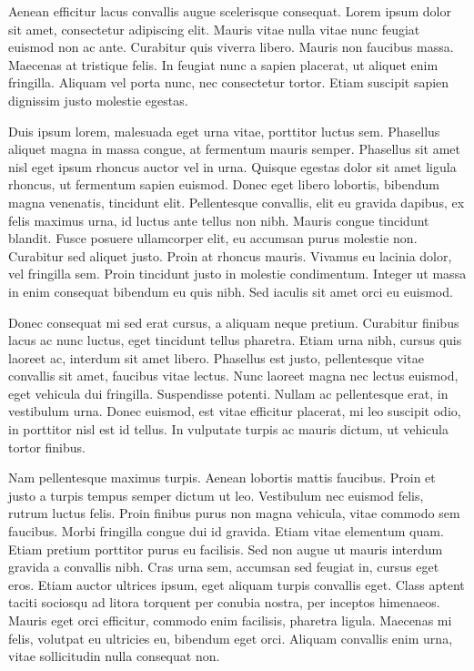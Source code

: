 \documentclass{icorsdssv2024}
\begin{document}
Aenean efficitur lacus convallis augue scelerisque consequat. Lorem ipsum dolor sit amet, consectetur adipiscing elit. Mauris vitae nulla vitae nunc feugiat euismod non ac ante. Curabitur quis viverra libero. Mauris non faucibus massa. Maecenas at tristique felis. In feugiat nunc a sapien placerat, ut aliquet enim fringilla. Aliquam vel porta nunc, nec consectetur tortor. Etiam suscipit sapien dignissim justo molestie egestas.

Duis ipsum lorem, malesuada eget urna vitae, porttitor luctus sem. Phasellus aliquet magna in massa congue, at fermentum mauris semper. Phasellus sit amet nisl eget ipsum rhoncus auctor vel in urna. Quisque egestas dolor sit amet ligula rhoncus, ut fermentum sapien euismod. Donec eget libero lobortis, bibendum magna venenatis, tincidunt elit. Pellentesque convallis, elit eu gravida dapibus, ex felis maximus urna, id luctus ante tellus non nibh. Mauris congue tincidunt blandit. Fusce posuere ullamcorper elit, eu accumsan purus molestie non. Curabitur sed aliquet justo. Proin at rhoncus mauris. Vivamus eu lacinia dolor, vel fringilla sem. Proin tincidunt justo in molestie condimentum. Integer ut massa in enim consequat bibendum eu quis nibh. Sed iaculis sit amet orci eu euismod.

Donec consequat mi sed erat cursus, a aliquam neque pretium. Curabitur finibus lacus ac nunc luctus, eget tincidunt tellus pharetra. Etiam urna nibh, cursus quis laoreet ac, interdum sit amet libero. Phasellus est justo, pellentesque vitae convallis sit amet, faucibus vitae lectus. Nunc laoreet magna nec lectus euismod, eget vehicula dui fringilla. Suspendisse potenti. Nullam ac pellentesque erat, in vestibulum urna. Donec euismod, est vitae efficitur placerat, mi leo suscipit odio, in porttitor nisl est id tellus. In vulputate turpis ac mauris dictum, ut vehicula tortor finibus.

Nam pellentesque maximus turpis. Aenean lobortis mattis faucibus. Proin et justo a turpis tempus semper dictum ut leo. Vestibulum nec euismod felis, rutrum luctus felis. Proin finibus purus non magna vehicula, vitae commodo sem faucibus. Morbi fringilla congue dui id gravida. Etiam vitae elementum quam. Etiam pretium porttitor purus eu facilisis. Sed non augue ut mauris interdum gravida a convallis nibh. Cras urna sem, accumsan sed feugiat in, cursus eget eros. Etiam auctor ultrices ipsum, eget aliquam turpis convallis eget. Class aptent taciti sociosqu ad litora torquent per conubia nostra, per inceptos himenaeos. Mauris eget orci efficitur, commodo enim facilisis, pharetra ligula. Maecenas mi felis, volutpat eu ultricies eu, bibendum eget orci. Aliquam convallis enim urna, vitae sollicitudin nulla consequat non.
\end{document}
